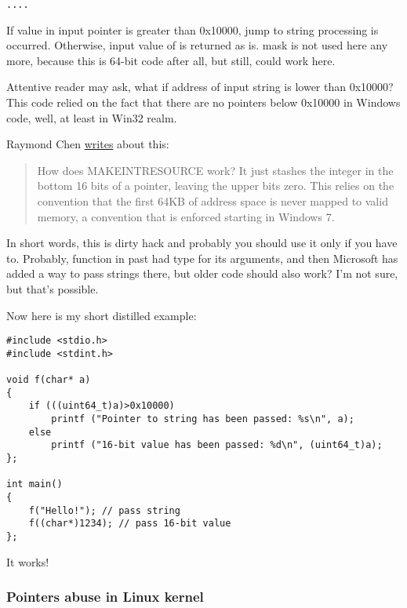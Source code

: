 \begin{lstlisting}
....

\end{lstlisting}

If value in input pointer is greater than 0x10000, jump to string processing is occurred.
Otherwise, input value of  is returned as is.
 mask is not used here any more, because this is 64-bit code after all, but still,  could work here.

Attentive reader may ask, what if address of input string is lower than 0x10000?
This code relied on the fact that there are no pointers below 0x10000 in Windows code, well, at least in Win32 realm.

Raymond Chen \href{https://blogs.msdn.microsoft.com/oldnewthing/20130925-00/?p=3123}{writes} about this:

\begin{framed}
\begin{quotation}
How does MAKE­INT­RESOURCE work? It just stashes the integer in the bottom 16 bits of a pointer, leaving the upper bits zero. This relies on the convention that the first 64KB of address space is never mapped to valid memory, a convention that is enforced starting in Windows 7.
\end{quotation}
\end{framed}

In short words, this is dirty hack and probably you should use it only if you have to.
Probably,  function in past had  type for its arguments, and then Microsoft has added a way to pass strings there,
but older code should also work? I'm not sure, but that's possible.

Now here is my short distilled example:

\begin{lstlisting}
#include <stdio.h>
#include <stdint.h>

void f(char* a)
{
	if (((uint64_t)a)>0x10000)
		printf ("Pointer to string has been passed: %s\n", a);
	else
		printf ("16-bit value has been passed: %d\n", (uint64_t)a);
};

int main()
{
	f("Hello!"); // pass string
	f((char*)1234); // pass 16-bit value
};
\end{lstlisting}

It works!

\subsubsection{Pointers abuse in Linux kernel}

